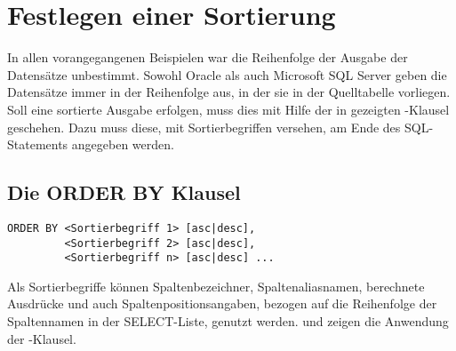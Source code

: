     \section{Festlegen einer Sortierung}
      In allen vorangegangenen Beispielen war die Reihenfolge der Ausgabe der Datensätze unbestimmt. Sowohl Oracle als auch Microsoft SQL Server geben die Datensätze immer in der Reihenfolge aus, in der sie in der Quelltabelle vorliegen. Soll eine sortierte Ausgabe erfolgen, muss dies mit Hilfe der in  gezeigten -Klausel geschehen. Dazu muss diese, mit Sortierbegriffen versehen, am Ende des SQL-Statements angegeben werden.
      \subsection{Die ORDER BY Klausel}
        \begin{lstlisting}[language=oracle_sql,caption={Die ORDER BY Klausel},label=sql02_14]
ORDER BY <Sortierbegriff 1> [asc|desc],
         <Sortierbegriff 2> [asc|desc],
         <Sortierbegriff n> [asc|desc] ...
        \end{lstlisting}
        Als Sortierbegriffe können Spaltenbezeichner, Spaltenaliasnamen, berechnete Ausdrücke und auch Spaltenpositionsangaben, bezogen auf die Reihenfolge der Spaltennamen in der SELECT-Liste, genutzt werden.  und  zeigen die Anwendung der -Klausel.

